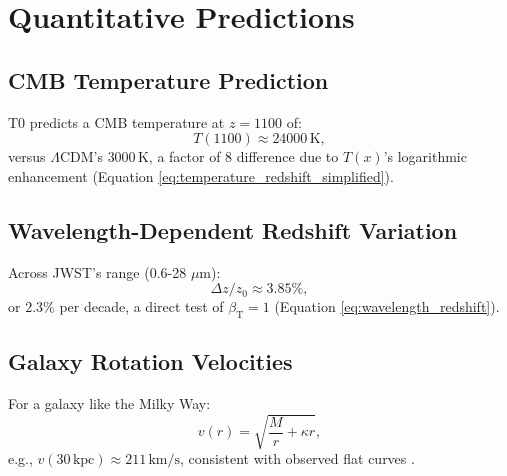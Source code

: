 \documentclass[12pt,a4paper]{article}
\newcommand{\Tfield}{T(x)}
\newcommand{\betaT}{\beta_{\text{T}}}
\begin{document}
	\section{Quantitative Predictions}
	\label{sec:predictions}
	
	\subsection{CMB Temperature Prediction}
	\label{subsec:cmb_temp_prediction}
	
	T0 predicts a CMB temperature at \(z = 1100\) of:
	\begin{equation}
		T(1100) \approx 24000 \, \text{K},
		\label{eq:cmb_temp_t0}
	\end{equation}
	versus \(\Lambda\)CDM’s \(3000 \, \text{K}\), a factor of 8 difference due to \(\Tfield\)’s logarithmic enhancement (Equation \ref{eq:temperature_redshift_simplified}).
	
	\subsection{Wavelength-Dependent Redshift Variation}
	\label{subsec:wavelength_redshift_prediction}
	
	Across JWST’s range (0.6-28 \(\mu\text{m}\)):
	\begin{equation}
		\Delta z / z_0 \approx 3.85\%,
		\label{eq:wavelength_variation}
	\end{equation}
	or \(2.3\%\) per decade, a direct test of \(\betaT = 1\) (Equation \ref{eq:wavelength_redshift}).
	
	\subsection{Galaxy Rotation Velocities}
	\label{subsec:rotation_velocity_prediction}
	
	For a galaxy like the Milky Way:
	\begin{equation}
		v(r) = \sqrt{\frac{M}{r} + \kappa r},
		\label{eq:rotation_velocity_repeat}
	\end{equation}
	e.g., \(v(30 \, \text{kpc}) \approx 211 \, \text{km/s}\), consistent with observed flat curves \cite{McGaugh2016}.
	
\end{document}
